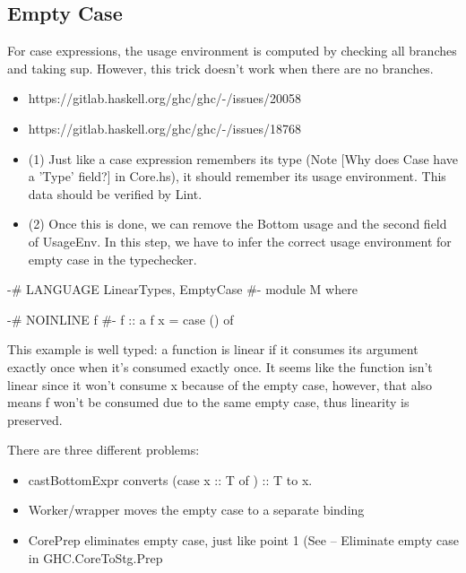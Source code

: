 \documentclass[a4paper, draft]{article}
\begin{document}
\subsection{Empty Case}

For case expressions, the usage environment is computed by checking all branches
and taking sup. However, this trick doesn't work when there are no branches.

\begin{itemize}
\item https://gitlab.haskell.org/ghc/ghc/-/issues/20058
\item https://gitlab.haskell.org/ghc/ghc/-/issues/18768

\item (1) Just like a case expression remembers its type (Note [Why does Case have a
'Type' field?] in Core.hs), it should remember its usage environment. This data
should be verified by Lint.

\item (2) Once this is done, we can remove the Bottom usage and the second field of
UsageEnv. In this step, we have to infer the correct usage environment for empty
case in the typechecker.
\end{itemize}

\begin{code}
{-# LANGUAGE LinearTypes, EmptyCase #-}
module M where

{-# NOINLINE f #-}
f :: a %
f x = case () of {}
\end{code}

This example is well typed: a function is linear if it consumes its argument
exactly once when it's consumed exactly once. It seems like the function isn't
linear since it won't consume x because of the empty case, however, that also
means f won't be consumed due to the same empty case, thus linearity is
preserved.


There are three different problems:

\begin{itemize}
\item castBottomExpr converts (case x :: T of {}) :: T to x.
\item Worker/wrapper moves the empty case to a separate binding
\item CorePrep eliminates empty case, just like point 1 (See -- Eliminate empty
    case in GHC.CoreToStg.Prep
\end{itemize}
\end{document}
